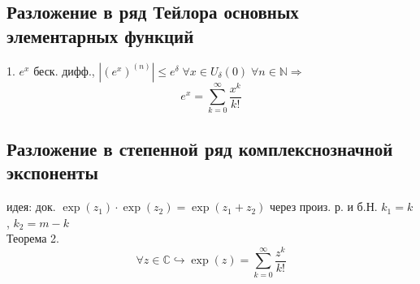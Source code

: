 \documentclass{article}
\begin{document}
\subsection{Разложение в ряд Тейлора основных элементарных функций}
1. $e^x$ беск. дифф., $|(e^x)^{(n)}| \leq e^\delta \; \forall x \in U_\delta (0) \; \forall n \in \mathbb N \Rightarrow$
\begin{equation*}
    e^x = \sum_{k=0}^\infty \frac{x^k}{k!}
\end{equation*}
\subsection{Разложение в степенной ряд комплекснозначной экспоненты}
идея: док. $\exp (z_1) \cdot \exp (z_2) = \exp (z_1+z_2)$ через произ. р. и б.Н. $k_1 = k$, $k_2 = m-k$ \\
Теорема 2.
\begin{equation*}
    \forall z \in \mathbb C \hookrightarrow \exp(z) = \sum_{k=0}^\infty \frac{z^k}{k!}
\end{equation*}
\end{document}
